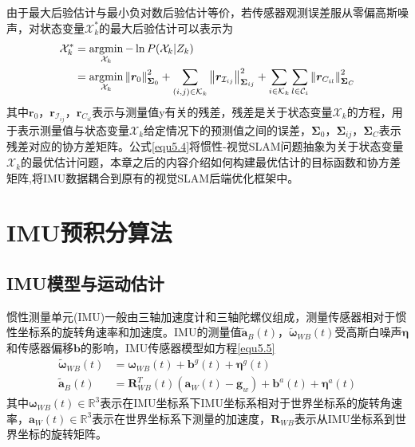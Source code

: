 由于最大后验估计与最小负对数后验估计等价，若传感器观测误差服从零偏高斯噪声，对状态变量$\mathcal{X}_k^*$的最大后验估计可以表示为
\begin{equation}
\label{equ5.4}
\begin{aligned}
\mathcal{X}_k^* & = \operatorname*{argmin}\limits_{\mathcal{X}_k}- \ln P(\mathcal{X}_k | Z_k) \\ 
& = \operatorname*{argmin}\limits_{\mathcal{X}_k} \left\Vert \boldsymbol{r}_0 \right\Vert_{\boldsymbol{\Sigma}_0}^2+ \sum\limits_{(i,j) \in \mathcal{K}_k}\left\Vert \boldsymbol{r}_{\mathcal{I}_{ij}} \right\Vert_{\boldsymbol{\Sigma}_{ij}}^2+ \sum\limits_{i \in \mathcal{K}_k}\sum\limits_{l \in \mathcal{C}_i} \left\Vert \boldsymbol{r}_{C_{il}} \right\Vert_{\boldsymbol{\Sigma}_{C}}^2
\end{aligned}
\end{equation}
其中$\boldsymbol{r}_0$，$ \boldsymbol{r}_{\mathcal{I}_{ij}}$，$\boldsymbol{r}_{C_{il}}$表示与测量值y有关的残差，残差是关于状态变量$\mathcal{X}_k$的方程，用于表示测量值与状态变量$\mathcal{X}_k$给定情况下的预测值之间的误差，$\boldsymbol{\Sigma}_0$，$ \boldsymbol{\Sigma}_{ij}$，$\boldsymbol{\Sigma}_C$表示残差对应的协方差矩阵。公式\eqref{equ5.4}将惯性-视觉SLAM问题抽象为关于状态变量$\mathcal{X}_k$的最优估计问题，本章之后的内容介绍如何构建最优估计的目标函数和协方差矩阵,将IMU数据耦合到原有的视觉SLAM后端优化框架中。


\section{IMU预积分算法}

\subsection{IMU模型与运动估计}
惯性测量单元(IMU)一般由三轴加速度计和三轴陀螺仪组成，测量传感器相对于惯性坐标系的旋转角速率和加速度。IMU的测量值$\widetilde{\boldsymbol{a}}_B(t)$，$\widetilde{\boldsymbol{\omega}}_{W\!B}(t)$受高斯白噪声$\boldsymbol{\eta}$和传感器偏移$\boldsymbol{b}$的影响，IMU传感器模型如方程\eqref{equ5.5}
\begin{equation}
\label{equ5.5}
\begin{aligned}
\widetilde{\boldsymbol{\omega}}_{W\!B}(t) &= \boldsymbol{\omega}_{W\!B}(t)+\boldsymbol{b}^g(t)+\boldsymbol{\eta}^g(t) \\
\widetilde{\boldsymbol{a}}_B(t) &= \boldsymbol{R}_{W\!B}^T(t)(\boldsymbol{a}_W(t)-\boldsymbol{g}_w)+\boldsymbol{b}^a(t)+\boldsymbol{\eta}^a(t)
\end{aligned}
\end{equation}
其中$\boldsymbol{\omega}_{W\!B}(t) \in \mathds{R}^3$表示在IMU坐标系下IMU坐标系相对于世界坐标系的旋转角速率，$\boldsymbol{a}_W(t) \in \mathds{R}^3$表示在世界坐标系下测量的加速度，$\boldsymbol{R}_{W\!B}$表示从IMU坐标系到世界坐标的旋转矩阵。

